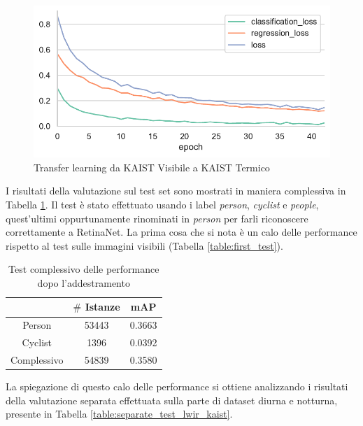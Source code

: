 \begin{figure}[]
    \centering
    \includegraphics[width=\textwidth]{images/graphic/ruby-yogurt-lwir.pdf}
    \caption{Transfer learning da KAIST Visibile a KAIST Termico}
    \label{fig:fine_tuning_2}
\end{figure} 
I risultati della valutazione sul test set sono mostrati in maniera complessiva in Tabella \ref{table:first_test_lwir_kaist}. Il test è stato effettuato usando i label \textit{person}, \textit{cyclist} e \textit{people}, quest'ultimi oppurtunamente rinominati in \textit{person} per farli riconoscere correttamente a RetinaNet. La prima cosa che si nota è un calo delle performance rispetto al test sulle immagini visibili (Tabella \ref{table:first_test}).
\begin{table}[]
    \centering
    \begin{tabular}{|c|c|c|}
    \hline
                & $\#$ Istanze & mAP    \\ \hline
    Person      & 53443             & 0.3663 \\ \hline
    Cyclist     & 1396              & 0.0392 \\ \hline
    Complessivo & 54839             & 0.3580 \\ \hline
    \end{tabular}
    \caption{Test complessivo delle performance dopo l'addestramento}
    \label{table:first_test_lwir_kaist}
\end{table}
La spiegazione di questo calo delle performance si ottiene analizzando i risultati della valutazione separata effettuata sulla parte di dataset diurna e notturna, presente in Tabella \ref{table:separate_test_lwir_kaist}. 
